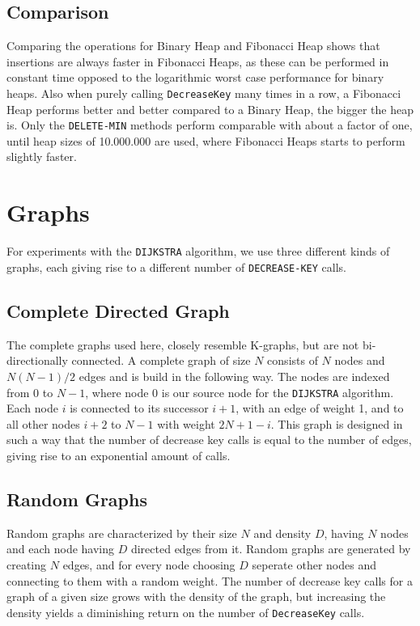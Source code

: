 \documentclass[a4paper,10pt]{article}
\begin{document}
\subsection{Comparison}
Comparing the operations for Binary Heap and Fibonacci Heap shows that insertions are always faster in Fibonacci Heaps, as these can be performed in constant time opposed to the logarithmic worst case performance for binary heaps. Also when purely calling \texttt{DecreaseKey} many times in a row, a Fibonacci Heap performs better and better compared to a Binary Heap, the bigger the heap is. Only the \texttt{DELETE\--MIN} methods perform comparable with about a factor of one, until heap sizes of 10.000.000 are used, where Fibonacci Heaps starts to perform slightly faster.

\section{Graphs}
For experiments with the \texttt{DIJKSTRA} algorithm, we use three different kinds of graphs, each giving rise to a different number of \texttt{DECREASE\--KEY} calls.
\subsection{Complete Directed Graph}
The complete graphs used here, closely resemble K-graphs, but are not bi-directionally connected. A complete graph of size $N$ consists of $N$ nodes and $N(N-1)/2$ edges and is build in the following way. The nodes are indexed from 0 to $N-1$, where node 0 is our source node for the \texttt{DIJKSTRA} algorithm. Each node $i$ is connected to its successor $i+1$, with an edge of weight 1, and to all other nodes $i+2$ to $N-1$ with weight $2N+1-i$. This graph is designed in such a way that the number of decrease key calls is equal to the number of edges, giving rise to an exponential amount of calls.

\subsection{Random Graphs}
Random graphs are characterized by their size $N$ and density $D$, having $N$ nodes and each node having $D$ directed edges from it. Random graphs are generated by creating $N$ edges, and for every node choosing $D$ seperate other nodes and connecting to them with a random weight. The number of decrease key calls for a graph of a given size grows with the density of the graph, but increasing the density yields a diminishing return on the number of \texttt{DecreaseKey} calls. 
\end{document}
